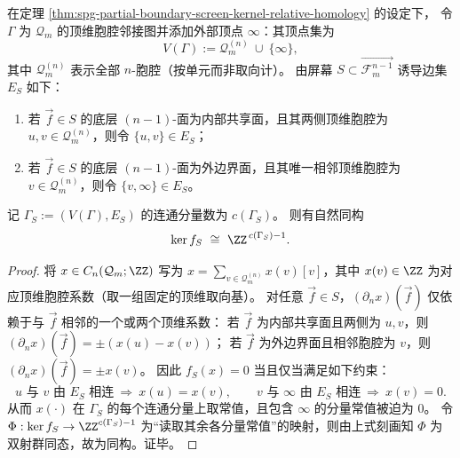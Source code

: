 \begin{theorem}[屏幕核的连通分量闭式]\label{thm:spg-screen-kernel-connected-components}
在定理 \ref{thm:spg-partial-boundary-screen-kernel-relative-homology} 的设定下，
令 \(\Gamma\) 为 \(\mathcal Q_m\) 的顶维胞腔邻接图并添加外部顶点 \(\infty\)：其顶点集为
\[
V(\Gamma):=\mathcal Q_m^{(n)}\ \cup\ \{\infty\},
\]
其中 \(\mathcal Q_m^{(n)}\) 表示全部 \(n\)-胞腔（按单元而非取向计）。
由屏幕 \(S\subset \overrightarrow{\mathcal F_{m}^{n-1}}\) 诱导边集 \(E_S\) 如下：
\begin{enumerate}
  \item 若 \(\vec f\in S\) 的底层 \((n-1)\)-面为内部共享面，且其两侧顶维胞腔为 \(u,v\in\mathcal Q_m^{(n)}\)，则令 \(\{u,v\}\in E_S\)；
  \item 若 \(\vec f\in S\) 的底层 \((n-1)\)-面为外边界面，且其唯一相邻顶维胞腔为 \(v\in\mathcal Q_m^{(n)}\)，则令 \(\{v,\infty\}\in E_S\)。
\end{enumerate}
记 \(\Gamma_S:=(V(\Gamma),E_S)\) 的连通分量数为 \(c(\Gamma_S)\)。
则有自然同构
\[
\ker f_S\ \cong\ \ZZ^{\,c(\Gamma_S)-1}.
\]
\end{theorem}
\begin{proof}
将 \(x\in C_n(\mathcal Q_m;\ZZ)\) 写为 \(x=\sum_{v\in\mathcal Q_m^{(n)}}x(v)[v]\)，其中 \(x(v)\in\ZZ\) 为对应顶维胞腔系数（取一组固定的顶维取向基）。
对任意 \(\vec f\in S\)，\((\partial_n x)(\vec f)\) 仅依赖于与 \(\vec f\) 相邻的一个或两个顶维系数：
若 \(\vec f\) 为内部共享面且两侧为 \(u,v\)，则
\(
(\partial_n x)(\vec f)=\pm(x(u)-x(v))
\)；
若 \(\vec f\) 为外边界面且相邻胞腔为 \(v\)，则
\(
(\partial_n x)(\vec f)=\pm x(v)
\)。
因此 \(f_S(x)=0\) 当且仅当满足如下约束：
\[
u\text{ 与 }v\text{ 由 }E_S\text{ 相连}\ \Longrightarrow\ x(u)=x(v),\qquad
v\text{ 与 }\infty\text{ 由 }E_S\text{ 相连}\ \Longrightarrow\ x(v)=0.
\]
从而 \(x(\cdot)\) 在 \(\Gamma_S\) 的每个连通分量上取常值，且包含 \(\infty\) 的分量常值被迫为 \(0\)。
令 \(\Phi:\ker f_S\to \ZZ^{c(\Gamma_S)-1}\) 为“读取其余各分量常值”的映射，则由上式刻画知 \(\Phi\) 为双射群同态，故为同构。证毕。
\end{proof}

